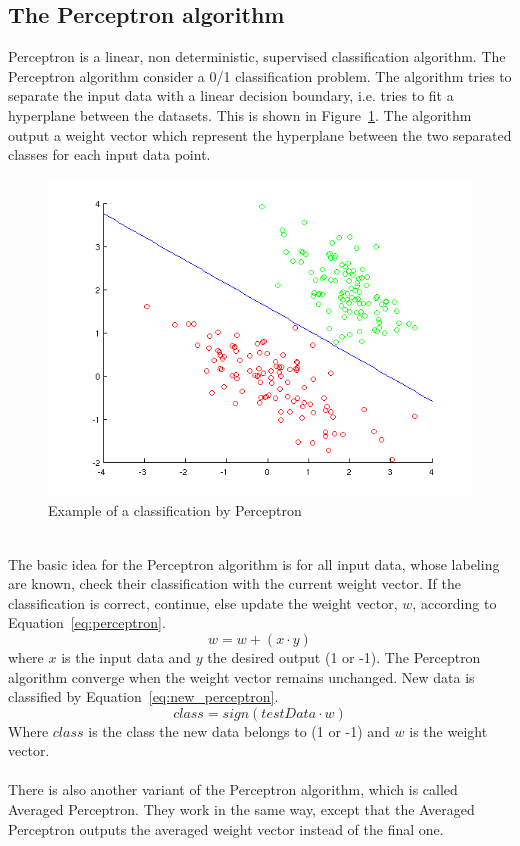 \subsection{The Perceptron algorithm}
Perceptron is a linear, non deterministic, supervised classification algorithm. The Perceptron algorithm consider a 0/1 classification problem. \citep{perceptron_ai}
The algorithm tries to separate the input data with a linear decision boundary, i.e. tries to fit a hyperplane between the datasets. \citep{perceptron_url} This is shown in Figure~\ref{fig:perceptron}. The algorithm output a weight vector which represent the hyperplane between the two separated classes for each input data point. \citep{perceptron_url}
\begin{figure}[h!]
\centering
\includegraphics[scale = 0.5]{fig/perceptron_example.png}
\caption{Example of a classification by Perceptron}
\label{fig:perceptron}
\end{figure}\\
The basic idea for the Perceptron algorithm is for all input data, whose labeling are known, check their classification with the current weight vector. If the classification is correct, continue, else update the weight vector, $w$, according to Equation~\ref{eq:perceptron}. \citep{perceptron_ai}
\begin{equation}
\label{eq:perceptron}
w = w + (x \cdot y)
\end{equation}
where $x$ is the input data and $y$ the desired output (1 or -1). The Perceptron algorithm converge when the weight vector remains unchanged. \citep{perceptron_ai} New data is classified by Equation~\ref{eq:new_perceptron}.
\begin{equation}
\label{eq:new_perceptron}
class = sign(testData \cdot w)
\end{equation}
Where $class$ is the class the new data belongs to (1 or -1) and $w$ is the weight vector.\\\\
There is also another variant of the Perceptron algorithm, which is called Averaged Perceptron. They work in the same way, except that the Averaged Perceptron outputs the averaged weight vector instead of the final one.

